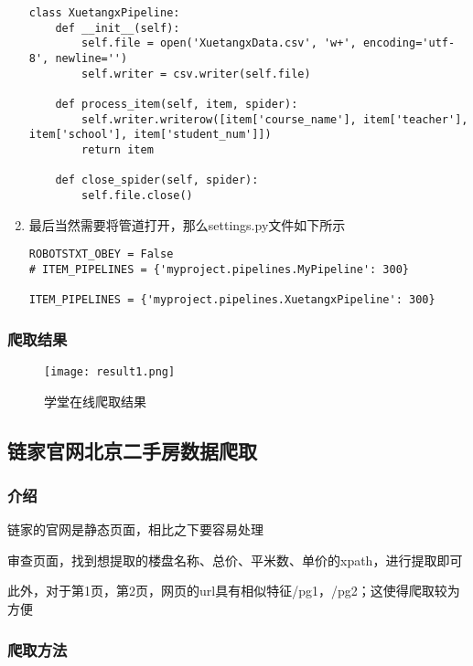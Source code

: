\documentclass[lang=cn,11pt,a4paper]{elegantpaper}
\begin{document}
\begin{enumerate}
\begin{lstlisting}
class XuetangxPipeline:
    def __init__(self):
        self.file = open('XuetangxData.csv', 'w+', encoding='utf-8', newline='')
        self.writer = csv.writer(self.file)

    def process_item(self, item, spider):
        self.writer.writerow([item['course_name'], item['teacher'], item['school'], item['student_num']])
        return item

    def close_spider(self, spider):
        self.file.close()
    \end{lstlisting}
    \item 最后当然需要将管道打开，那么settings.py文件如下所示
    \begin{lstlisting}
ROBOTSTXT_OBEY = False
# ITEM_PIPELINES = {'myproject.pipelines.MyPipeline': 300}

ITEM_PIPELINES = {'myproject.pipelines.XuetangxPipeline': 300}
    \end{lstlisting}
\end{enumerate}

\subsubsection{爬取结果}

\clearpage

\begin{figure}[!htb]
    \centering
    \texttt{[image: result1.png]}
    \caption{学堂在线爬取结果}
    \label{fig:enter-label}
\end{figure}

\subsection{链家官网北京二手房数据爬取}

\subsubsection{介绍}
链家的官网是静态页面，相比之下要容易处理

审查页面，找到想提取的楼盘名称、总价、平米数、单价的xpath，进行提取即可

此外，对于第1页，第2页，网页的url具有相似特征/pg1，/pg2；这使得爬取较为方便

\subsubsection{爬取方法}
\end{document}
